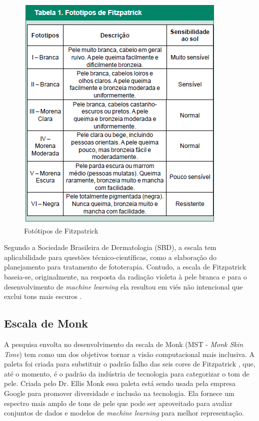 \begin{figure}[h]
\caption{Fotótipos de Fitzpatrick}
\centering

\includegraphics[]{Template_Latex_TCC-UNIFTEC/_lib/imagens/fototipo.png}

\label{fig:x fototipo_fitzpatrick}
\end{figure}

Segundo a Sociedade Brasileira de Dermatologia (SBD)\cite{Classificacao-dos-fototipos-de-pele-SBD}, a escala tem aplicabilidade para questões técnico-científicas, como a elaboração do planejamento para tratamento de fototerapia. Contudo, a escala de Fitzpatrick baseia-se, originalmente, na resposta da radiação violeta à pele branca \cite{Classificao_de_fototipos_de_pele} e para o desenvolvimento de \textit{machine learning} ela resultou em viés não intencional que exclui tons mais escuros \cite{Monk_2019}.
 

\subsection{Escala de Monk}
A pesquisa envolta no desenvolvimento da escala de Monk (MST - \textit{Monk Skin Tone}) tem como um dos objetivos tornar a visão computacional mais inclusiva. A paleta foi criada para substituir o padrão falho das seis cores de Fitzpatrick \cite{Monk_2019}, que, até o momento, é o padrão da indústria de tecnologia para categorizar o tom de pele. Criada pelo Dr. Ellis Monk essa paleta está sendo usada pela empresa Google para promover diversidade e inclusão na tecnologia. Ela fornece um espectro mais amplo de tons de pele que pode ser aproveitado para avaliar conjuntos de dados e modelos de \textit{machine learning} para melhor representação.

